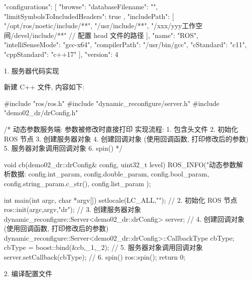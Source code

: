 \documentclass[openany, fontset=windowsold]{ctexbook}
\theoremstyle{kaiti}
\theoremstyle{normal}
\begin{document}
\begin{bash}
  {
      "configurations": [
          {
              "browse": {
                  "databaseFilename": "",
                  "limitSymbolsToIncludedHeaders": true
              },
              "includePath": [
                  "/opt/ros/noetic/include/**",
                  "/usr/include/**",
                  "/xxx/yyy工作空间/devel/include/**" // 配置 head 文件的路径 
              ],
              "name": "ROS",
              "intelliSenseMode": "gcc-x64",
              "compilerPath": "/usr/bin/gcc",
              "cStandard": "c11",
              "cppStandard": "c++17"
          }
      ],
      "version": 4
  }
\end{bash}

1. 服务器代码实现

新建 C++ 文件, 内容如下:

\begin{cpp}
  #include "ros/ros.h"
  #include "dynamic_reconfigure/server.h"
  #include "demo02_dr/drConfig.h"

  /*  
      动态参数服务端: 参数被修改时直接打印
      实现流程:
          1. 包含头文件
          2. 初始化 ROS 节点
          3. 创建服务器对象
          4. 创建回调对象 (使用回调函数, 打印修改后的参数)
          5. 服务器对象调用回调对象
          6. spin()
  */

  void cb(demo02_dr::drConfig& config, uint32_t level){
      ROS_INFO("动态参数解析数据:%
          config.int_param,
          config.double_param,
          config.bool_param,
          config.string_param.c_str(),
          config.list_param
      );
  }

  int main(int argc, char *argv[])
  {
      setlocale(LC_ALL,"");
      // 2. 初始化 ROS 节点
      ros::init(argc,argv,"dr");
      // 3. 创建服务器对象
      dynamic_reconfigure::Server<demo02_dr::drConfig> server;
      // 4. 创建回调对象 (使用回调函数, 打印修改后的参数)
      dynamic_reconfigure::Server<demo02_dr::drConfig>::CallbackType cbType;
      cbType = boost::bind(&cb,_1,_2);
      // 5. 服务器对象调用回调对象
      server.setCallback(cbType);
      // 6. spin()
      ros::spin();
      return 0;
  }
\end{cpp}

2. 编译配置文件

\end{document}
